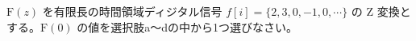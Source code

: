$\textrm{F}(z)$ を有限長の時間領域ディジタル信号 $f[i] = \{2, 3, 0, -1, 0, \cdots \}$ の Z 変換とする。$\textrm{F}(0)$ の値を選択肢a〜dの中から1つ選びなさい。
